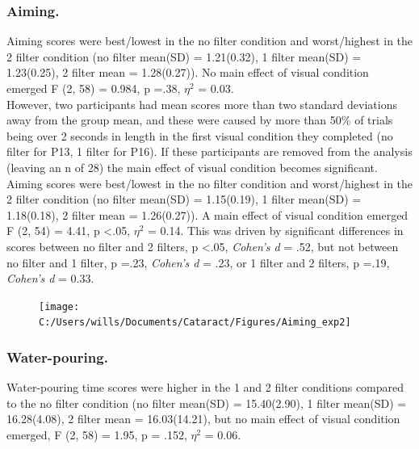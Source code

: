 \documentclass[
  english,
  man,floatsintext]{apa6}
\begin{document}
\hypertarget{aiming.-1}{%
\subsubsection{Aiming.}\label{aiming.-1}}

Aiming scores were best/lowest in the no filter condition and worst/highest in the 2 filter condition (no filter mean(SD) = 1.21(0.32), 1 filter mean(SD) = 1.23(0.25), 2 filter mean = 1.28(0.27)).
No main effect of visual condition emerged F (2, 58) = 0.984, p =.38, \(\eta^2\) = 0.03.\\
However, two participants had mean scores more than two standard deviations away from the group mean, and these were caused by more than 50\% of trials being over 2 seconds in length in the first visual condition they completed (no filter for P13, 1 filter for P16).
If these participants are removed from the analysis (leaving an n of 28) the main effect of visual condition becomes significant.
Aiming scores were best/lowest in the no filter condition and worst/highest in the 2 filter condition (no filter mean(SD) = 1.15(0.19), 1 filter mean(SD) = 1.18(0.18), 2 filter mean = 1.26(0.27)).
A main effect of visual condition emerged F (2, 54) = 4.41, p \textless{}.05, \(\eta^2\) = 0.14. This was driven by significant differences in scores between no filter and 2 filters, p \textless{}.05, \emph{Cohen's d} = .52, but not between no filter and 1 filter, p =.23, \emph{Cohen's d} = .23, or 1 filter and 2 filters, p =.19, \emph{Cohen's d} = 0.33.

\begin{figure}

{\centering \texttt{[image: C:/Users/wills/Documents/Cataract/Figures/Aiming\_exp2]} 

}

\caption{ }\label{fig:unnamed-chunk-9}
\end{figure}

\hypertarget{water-pouring.}{%
\subsubsection{Water-pouring.}\label{water-pouring.}}

Water-pouring time scores were higher in the 1 and 2 filter conditions compared to the no filter condition (no filter mean(SD) = 15.40(2.90), 1 filter mean(SD) = 16.28(4.08), 2 filter mean = 16.03(14.21), but no main effect of visual condition emerged, F (2, 58) = 1.95, p = .152, \(\eta^2\) = 0.06.
\end{document}
